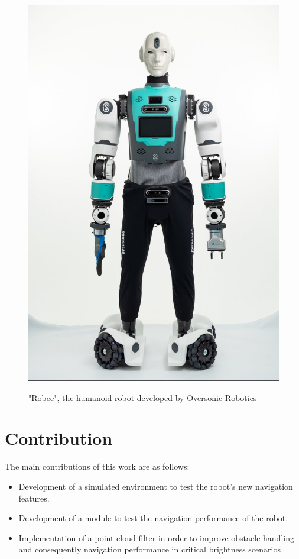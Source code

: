 \begin{figure}[H]
    \centering
    \includegraphics[scale=0.25]{Images/Introduction/robee_frontale.jpg}
    \caption{"Robee", the humanoid robot developed by Oversonic Robotics}
    \label{fig:robee}
    \citet{robeeimg}
\end{figure}
\section{Contribution}
The main contributions of this work are as follows:
\begin{itemize}
    \item Development of a simulated environment to test the robot's new navigation features. 
    \item Development of a module to test the navigation performance of the robot.
    \item Implementation of a point-cloud filter in order to improve obstacle handling and consequently navigation performance in critical brightness scenarios
\end{itemize}

